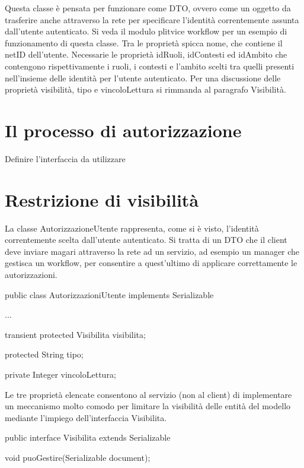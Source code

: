 Questa classe è pensata per funzionare come DTO, ovvero come un oggetto da trasferire anche attraverso la rete per specificare l'identità correntemente assunta dall'utente autenticato. Si veda il modulo plitvice workflow per un esempio di funzionamento di questa classe.
Tra le proprietà spicca nome, che contiene il netID dell'utente. Necessarie le proprietà idRuoli, idContesti ed idAmbito che contengono rispettivamente i ruoli, i contesti e l'ambito scelti tra quelli presenti nell'insieme delle identità per l'utente autenticato.
Per una discussione delle proprietà visibilità, tipo e vincoloLettura si rimmanda al paragrafo Visibilità. 

\section{Il processo di autorizzazione}
Definire l'interfaccia da utilizzare

\section{Restrizione di visibilità}
La classe AutorizzazioneUtente rappresenta, come si è visto, l'identità correntemente scelta dall'utente autenticato. Si tratta di un DTO che il client deve inviare magari attraverso la rete ad un servizio, ad esempio un manager che gestisca un workflow, per consentire a quest'ultimo di applicare correttamente le autorizzazioni.

\begin{java}

public class AutorizzazioniUtente implements Serializable {
  
  ...
  
  transient protected Visibilita visibilita;

  protected String tipo;

  private Integer vincoloLettura;

}
\end{java}

Le tre proprietà elencate consentono al servizio (non al client) di implementare un meccanismo molto comodo per limitare la visibilità delle entità del modello mediante l'impiego dell'interfaccia Visibilita.

\begin{java}
public interface Visibilita extends Serializable {

  void puoGestire(Serializable document);

}
\end{java}

